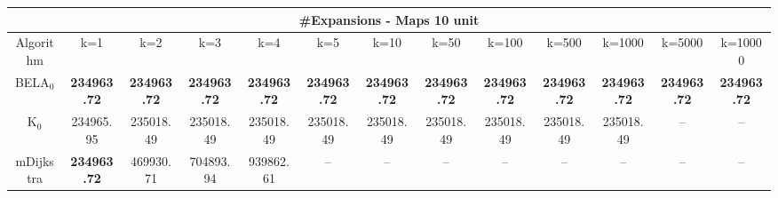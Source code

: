 \begin{tabular}{c|cccccccccccc}\toprule
\multicolumn{13}{c}{#Expansions - Maps 10 unit}\\ \midrule
Algorithm & k=1 & k=2 & k=3 & k=4 & k=5 & k=10 & k=50 & k=100 & k=500 & k=1000 & k=5000 & k=10000 \\ \midrule
BELA$_0$ & \textbf{234963.72} & \textbf{234963.72} & \textbf{234963.72} & \textbf{234963.72} & \textbf{234963.72} & \textbf{234963.72} & \textbf{234963.72} & \textbf{234963.72} & \textbf{234963.72} & \textbf{234963.72} & \textbf{234963.72} & \textbf{234963.72} \\
K$_0$ & 234965.95 & 235018.49 & 235018.49 & 235018.49 & 235018.49 & 235018.49 & 235018.49 & 235018.49 & 235018.49 & 235018.49 & -- & -- \\
mDijkstra & \textbf{234963.72} & 469930.71 & 704893.94 & 939862.61 & -- & -- & -- & -- & -- & -- & -- & -- \\ \bottomrule 
\end{tabular}
